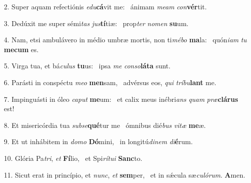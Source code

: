 2. Super aquam refectiónis \textit{e}\textit{du}\textbf{cá}vit me: \ast\  ánimam \textit{me}\textit{am} \textit{con}\textbf{vér}tit.\

3. Dedúxit me super sémi\textit{tas} \textit{jus}\textbf{tí}tiæ: \ast\  prop\textit{ter} \textit{no}\textit{men} \textbf{su}um.\

4. Nam, etsi ambulávero in médio umbræ mortis, non ti\textit{mé}\textit{bo} \textbf{ma}la: \ast\  quón\textit{i}\textit{am} \textit{tu} \textbf{me}\textbf{cum} es.\

5. Virga tua, et bá\textit{cu}\textit{lus} \textbf{tu}us: \ast\  ipsa \textit{me} \textit{con}\textit{so}\textbf{lá}\textbf{ta} sunt.\

6. Parásti in conspéctu \textit{me}\textit{o} \textbf{men}sam, \ast\  advérsus eos, \textit{qui} \textit{trí}\textit{bu}\textbf{lant} me.\

7. Impinguásti in óleo \textit{ca}\textit{put} \textbf{me}um: \ast\  et calix meus inébri\textit{ans} \textit{quam} \textit{præ}\textbf{clá}\textbf{rus} est!\

8. Et misericórdia tua \textit{sub}\textit{se}\textbf{qué}tur me \ast\  ómnibus dié\textit{bus} \textit{vi}\textit{tæ} \textbf{me}æ.\

9. Et ut inhábitem in \textit{do}\textit{mo} \textbf{Dó}mini, \ast\  in longitú\textit{di}\textit{nem} \textit{di}\textbf{é}rum.\

10. Glória Pa\textit{tri}, \textit{et} \textbf{Fí}lio, \ast\  et Spi\textit{rí}\textit{tu}\textit{i} \textbf{Sanc}to.\

11. Sicut erat in princípio, et \textit{nunc}, \textit{et} \textbf{sem}per, \ast\  et in sǽcula sæ\textit{cu}\textit{ló}\textit{rum}. \textbf{A}men.\

